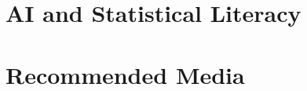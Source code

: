 \documentclass[10pt]{beamer}
\begin{document}
  \section{AI and Statistical Literacy}
  \section{Recommended Media}
  

\end{document}

